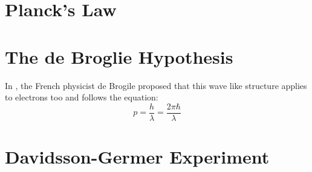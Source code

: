 \section{Planck's Law}

\section{The de Broglie Hypothesis}
In , the French physicist de Brogile proposed that this wave like structure applies to electrons too and follows the equation:
\begin{equation}
	p = \frac{h}{\lambda} = \frac{2 \pi \hbar}{ \lambda}
\end{equation}
\section{Davidsson-Germer Experiment}
